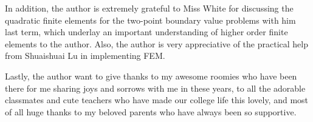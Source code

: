 	In addition, the author is extremely grateful to Miss White for discussing 
	the quadratic finite elements for the two-point boundary value problems 
	with him last term, which underlay an important understanding of higher 
	order finite elements to the author. Also, the author is very appreciative
	of the practical help from Shuaishuai Lu in implementing FEM.
	
	Lastly, the author want to give thanks to my awesome roomies who have been 
	there for me sharing joys and sorrows with me in these years, to all the 
	adorable classmates and cute teachers who have made our college life this 
	lovely, and most of all huge thanks to my beloved parents who have always 
	been so supportive.
	\thispagestyle{empty}
	
	\clearpage
	\hypertarget{Contents}{}  %
	\tableofcontents
	
	\listofalgorithms
	
	
	\clearpage
